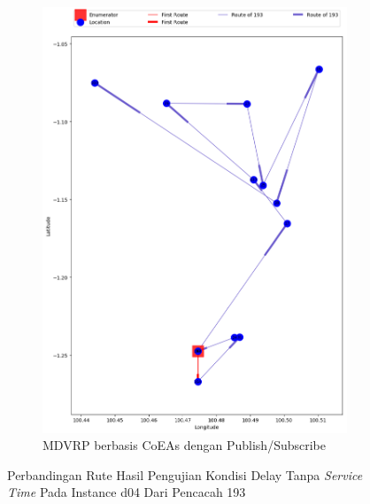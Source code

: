 \begin{figure}[H]\ContinuedFloat
	\centering
	\begin{subfigure}[t]{\textwidth}
		\centering
		\includegraphics[width=\textwidth]{Resources/Images/delayed_5/real_m15_n100_delayed_5_193_pubsub_coes}
		\caption{MDVRP berbasis CoEAs dengan Publish/Subscribe}
		\label{fig:real_m15_n100_delayed_5_193_pubsub_coes}
	\end{subfigure}
	\caption{Perbandingan Rute Hasil Pengujian Kondisi Delay Tanpa \textit{Service Time} Pada Instance d04 Dari Pencacah 193}
	\label{fig:real_m15_n100_delayed_5_193_contd}
\end{figure}


